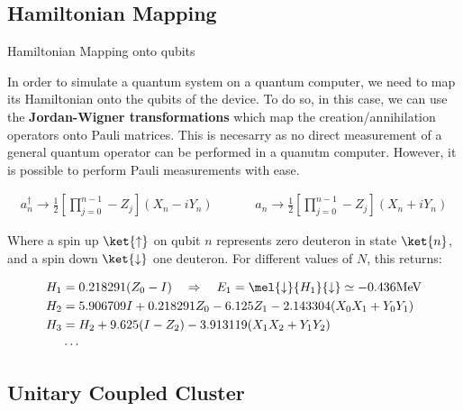 \documentclass[9pt, handout, aspectratio=169]{beamer}		%
\begin{document}

	\subsection{Hamiltonian Mapping}

	\begin{frame}{Hamiltonian Mapping onto qubits}

		In order to simulate a quantum system on a quantum computer, we need to map its Hamiltonian onto the qubits of the device. To do so, in this case, we can use the \textbf{Jordan-Wigner transformations} which map the creation/annihilation operators onto Pauli matrices. This is necesarry as no direct measurement of a general quantum operator can be performed in a quanutm computer. However, it is possible to perform Pauli measurements with ease.

		\begin{align*}
			a^{\dagger}_{n} \rightarrow \frac{1}{2} \left[ \prod^{n-1}_{j=0} -Z_j \right] (X_n - i Y_n)
			\hspace{40pt}
			a_{n} \rightarrow \frac{1}{2} \left[ \prod^{n-1}_{j=0} -Z_j \right] (X_n + i Y_n)
		\end{align*}

		Where a spin up $\ket{\uparrow}$ on qubit $n$ represents zero deuteron in state $\ket{n}$, and a spin down $\ket{\downarrow}$ one deuteron. For different values of $N$, this returns:

		\begin{align*}
			H_1 &= 0.218291(Z_0 - I) \quad \Rightarrow \quad E_1 = \mel{\downarrow}{H_1}{\downarrow} \simeq -0.436 \text{MeV} \\
			H_2 &= 5.906709 I + 0.218291 Z_0 - 6.125 Z_1 - 2.143304(X_0 X_1 + Y_0 Y_1) \\
			H_3 &= H_2 + 9.625(I-Z_2) - 3.913119(X_1 X_2 + Y_1 Y_2) \\
			&\cdots
		\end{align*}

		\vspace{-20pt}

	\end{frame}


	\subsection{Unitary Coupled Cluster}
\end{document}
